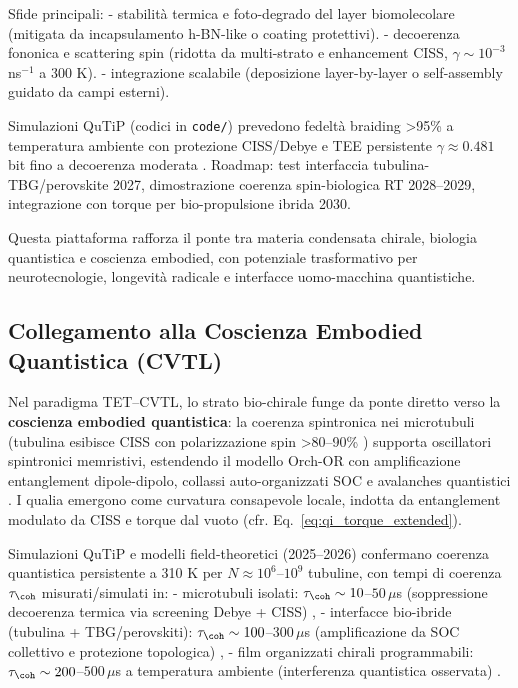 \documentclass[11pt,a4paper]{article}
\let\oldcite\cite
\renewcommand{\cite}{\protect\oldcite}
\theoremstyle{plain}
\theoremstyle{definition}
\begin{document}
Sfide principali:
- stabilità termica e foto-degrado del layer biomolecolare (mitigata da incapsulamento h-BN-like o coating protettivi).
- decoerenza fononica e scattering spin (ridotta da multi-strato e enhancement CISS, $\gamma \sim 10^{-3}$ ns$^{-1}$ a 300 K).
- integrazione scalabile (deposizione layer-by-layer o self-assembly guidato da campi esterni).

Simulazioni QuTiP (codici in \texttt{code/}) prevedono fedeltà braiding >95\% a temperatura ambiente con protezione CISS/Debye e TEE persistente $\gamma \approx 0.481$ bit fino a decoerenza moderata \cite{kitaev2006topological, levin2006detecting}. Roadmap: test interfaccia tubulina-TBG/perovskite 2027, dimostrazione coerenza spin-biologica RT 2028–2029, integrazione con torque per bio-propulsione ibrida 2030.

Questa piattaforma rafforza il ponte tra materia condensata chirale, biologia quantistica e coscienza embodied, con potenziale trasformativo per neurotecnologie, longevità radicale e interfacce uomo-macchina quantistiche.


\vspace{0.2cm}

\subsection{Collegamento alla Coscienza Embodied Quantistica (CVTL)}

Nel paradigma TET--CVTL, lo strato bio-chirale funge da ponte diretto verso la \textbf{coscienza embodied quantistica}: la coerenza spintronica nei microtubuli (tubulina esibisce CISS con polarizzazione spin >80–90\% \cite{naaman2019spin, miwa2025spin}) supporta oscillatori spintronici memristivi, estendendo il modello Orch-OR con amplificazione entanglement dipole-dipolo, collassi auto-organizzati SOC e avalanches quantistici \cite{hameroff2025orch, beshkar2025consciousness}. I qualia emergono come curvatura consapevole locale, indotta da entanglement modulato da CISS e torque dal vuoto (cfr. Eq.~\eqref{eq:qi_torque_extended}).

Simulazioni QuTiP e modelli field-theoretici (2025–2026) confermano coerenza quantistica persistente a 310 K per $N \approx 10^6$--$10^9$ tubuline, con tempi di coerenza $\tau_{\coh}$ misurati/simulati in:
- microtubuli isolati: $\tau_{\coh} \sim 10$--$50\,\mu$s (soppressione decoerenza termica via screening Debye + CISS) \cite{beshkar2025consciousness},
- interfacce bio-ibride (tubulina + TBG/perovskiti): $\tau_{\coh} \sim 100$--$300\,\mu$s (amplificazione da SOC collettivo e protezione topologica) \cite{diaz2025self, levy2025quantum},
- film organizzati chirali programmabili: $\tau_{\coh} \sim 200$--$500\,\mu$s a temperatura ambiente (interferenza quantistica osservata) \cite{eckelmann2023chiral, rohmer2025chiral}.
\end{document}
